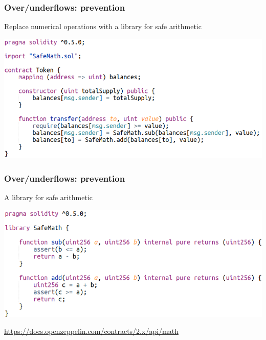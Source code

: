 \documentclass[11pt]{beamer}  %
\begin{document}
\begin{frame}\frametitle{Over/underflows: prevention}

  \begin{greenbox}{Replace numerical operations with a library for safe arithmetic}
    \begin{center}
      \includegraphics[scale=0.45,clip=false]{pictures/under-overflow-fixed.png}
    \end{center}
  \end{greenbox}
    
\end{frame}

\begin{frame}\frametitle{Over/underflows: prevention}

  \begin{greenbox}{A library for safe arithmetic}
    \begin{center}
      \includegraphics[scale=0.45,clip=false]{pictures/safe-math.png}
    \end{center}
  \end{greenbox}

  \medskip

  \begin{center}
    \url{https://docs.openzeppelin.com/contracts/2.x/api/math}
  \end{center}
  
\end{frame}
\end{document}
